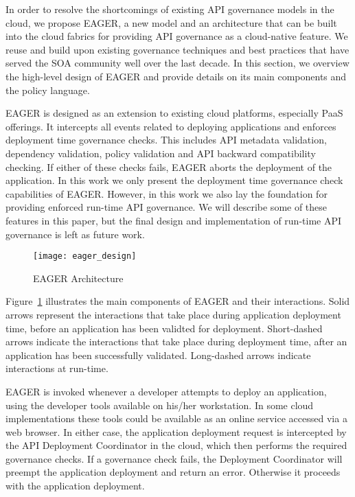 In order to resolve the shortcomings of existing API governance models in the cloud, we propose EAGER, a new model and an architecture
that can be built into the cloud fabrics for providing API governance as a cloud-native feature. We reuse and build upon existing governance
techniques and best practices that have served the SOA community well over the last decade. In this section, we overview the high-level
design of EAGER and provide details on its main components and the policy language.

EAGER is designed as an extension to existing cloud platforms, especially PaaS offerings. It intercepts all events related to deploying applications
and enforces deployment time governance checks. This includes API metadata validation, dependency validation, policy validation and 
API backward compatibility
checking. If either of these checks fails, EAGER aborts the deployment of the application.
In this work we only present the deployment time governance check capabilities of EAGER. However, in this work we also lay the foundation for
providing enforced run-time API governance. We will describe some of these features in this paper, but the final design and implementation of
run-time API governance is left as future work.

\begin{figure}
\centering
\texttt{[image: eager\_design]}
\caption{EAGER Architecture}
\label{fig:eager_design}
\end{figure}

Figure~\ref{fig:eager_design} illustrates the main components of EAGER and their interactions. Solid arrows represent the interactions that take
place during application deployment time, before an application has been validted for deployment. Short-dashed arrows indicate
the interactions that take place during deployment time, after an application has been successfully validated. Long-dashed arrows indicate
interactions at run-time.

EAGER is invoked whenever a developer attempts to deploy an application, using the developer
tools available on his/her workstation. In some cloud implementations these tools could be available as an online service accessed 
via a web browser. In either case, the application deployment request is intercepted by the API Deployment Coordinator in the cloud, which
then performs the required governance checks. If a governance check fails, the Deployment Coordinator
will preempt the application deployment and return an error. Otherwise it proceeds with the application deployment.

